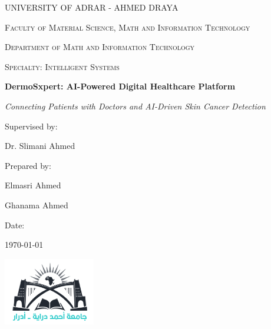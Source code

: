 
\begin{titlepage}
    \centering
    {\scshape\Large UNIVERSITY OF ADRAR - AHMED DRAYA \par}
    \vspace{1cm}
    {\scshape\large Faculty of Material Science, Math and Information Technology \par} %
    \vspace{0.5cm}
    {\scshape\large Department of Math and Information Technology \par} %
    \vspace{0.5cm}
    {\scshape\large Specialty: Intelligent Systems \par} %
    \vspace{1.5cm}
    {\huge\bfseries DermoSxpert: AI-Powered Digital Healthcare Platform \par}
    \vspace{1cm}
    {\Large\itshape Connecting Patients with Doctors and AI-Driven Skin Cancer Detection\par}
    \vfill
    {\large Supervised by: \par
    Dr. Slimani Ahmed \par}
    \vspace{2cm}
    {\large Prepared by: \par
    Elmasri Ahmed \par
    Ghanama Ahmed \par}
    \vspace{1cm}
    {\large Date: \par
    \today \par}
    \vspace{1cm}
    \includegraphics[width=4cm]{images_pfe/adrar_university_logo.png} %
    \par
\end{titlepage}


